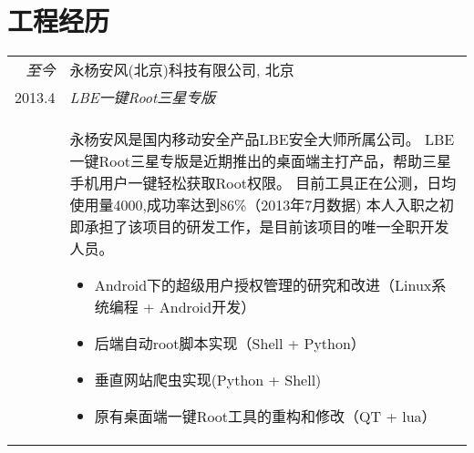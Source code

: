 \documentclass[a4paper,10pt]{article} %
\begin{document}
\section{工程经历}
\begin{tabular}{r|p{11cm}}

\emph{至今} &  \textsc{永杨安风(北京)科技有限公司}, 北京 \smallskip\\
\textsc{2013.4} & \emph{LBE一键Root三星专版}\\ 
& \footnotesize{
永杨安风是国内移动安全产品LBE安全大师所属公司。\linebreak
LBE一键Root三星专版是近期推出的桌面端主打产品，帮助三星手机用户一键轻松获取Root权限。
目前工具正在公测，日均使用量4000,成功率达到86\%（2013年7月数据)
本人入职之初即承担了该项目的研发工作，是目前该项目的唯一全职开发人员。
\begin{itemize}
\item Android下的超级用户授权管理的研究和改进（Linux系统编程 + Android开发）
\item 后端自动root脚本实现（Shell + Python）
\item 垂直网站爬虫实现(Python + Shell)
\item 原有桌面端一键Root工具的重构和修改（QT + lua）
\end{itemize}

}\smallskip\\


\end{tabular}
\end{document}
